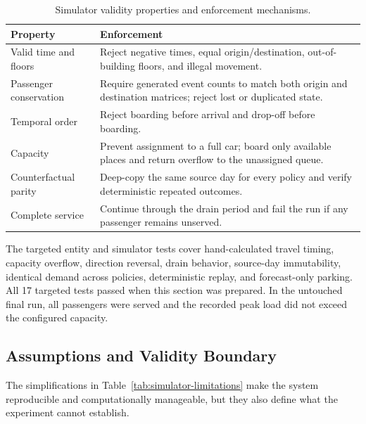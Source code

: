 \documentclass[12pt]{article}
\begin{document}
\begin{table}[htbp]
  \centering
  \caption{Simulator validity properties and enforcement mechanisms.}
  \label{tab:simulator-invariants}
  \begin{tabular}{@{}>{\raggedright\arraybackslash}p{}
    >{\raggedright\arraybackslash}p{}@{}}
    \toprule
    Property & Enforcement \\
    \midrule
    Valid time and floors & Reject negative times, equal origin/destination,
      out-of-building floors, and illegal movement. \\
    Passenger conservation & Require generated event counts to match both
      origin and destination matrices; reject lost or duplicated state. \\
    Temporal order & Reject boarding before arrival and drop-off before
      boarding. \\
    Capacity & Prevent assignment to a full car; board only available places
      and return overflow to the unassigned queue. \\
    Counterfactual parity & Deep-copy the same source day for every policy and
      verify deterministic repeated outcomes. \\
    Complete service & Continue through the drain period and fail the run if
      any passenger remains unserved. \\
    \bottomrule
  \end{tabular}
\end{table}

The targeted entity and simulator tests cover hand-calculated travel timing,
capacity overflow, direction reversal, drain behavior, source-day immutability,
identical demand across policies, deterministic replay, and forecast-only
parking. All 17 targeted tests passed when this section was prepared. In the
untouched final run, all passengers were served and the recorded peak load did
not exceed the configured capacity.

\subsection{Assumptions and Validity Boundary}

The simplifications in Table~\ref{tab:simulator-limitations} make the system
reproducible and computationally manageable, but they also define what the
experiment cannot establish.
\end{document}
